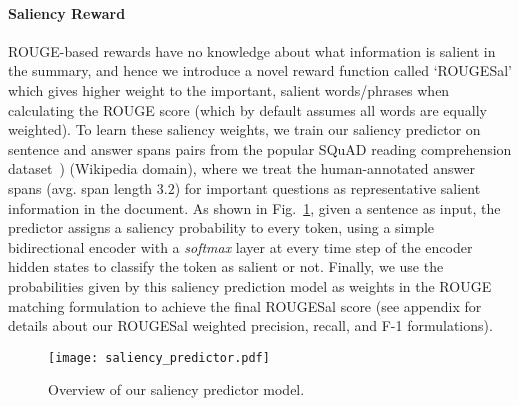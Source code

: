 \documentclass[11pt,a4paper]{article}
\begin{document}
\paragraph{Saliency Reward}
\label{subsec:saliency-rewards}
ROUGE-based rewards have no knowledge about what information is salient in the summary, and hence we introduce a novel reward function called `ROUGESal' which gives higher weight to the important, salient words/phrases when calculating the ROUGE score (which by default assumes all words are equally weighted). To learn these saliency weights, we train our saliency predictor on sentence and answer spans pairs from the popular SQuAD reading comprehension dataset~\cite{rajpurkar2016squad}) (Wikipedia domain), where we treat the human-annotated answer spans (avg. span length $3.2$) for important questions as representative salient information in the document. As shown in Fig.~\ref{fig:saliency-predictor}, given a sentence as input, the predictor assigns a saliency probability to every token, using a simple bidirectional encoder with a \emph{softmax} layer at every time step of the encoder hidden states to classify the token as salient or not. Finally, we use the probabilities given by this saliency prediction model as weights in the ROUGE matching formulation to achieve the final ROUGESal score (see appendix for details about our ROUGESal weighted precision, recall, and F-1 formulations).


\begin{figure}
\centering
\texttt{[image: saliency\_predictor.pdf]}
\vspace{-10pt}
\caption{Overview of our saliency predictor model.}
\vspace{-15pt}
\label{fig:saliency-predictor}
\end{figure}
\end{document}
